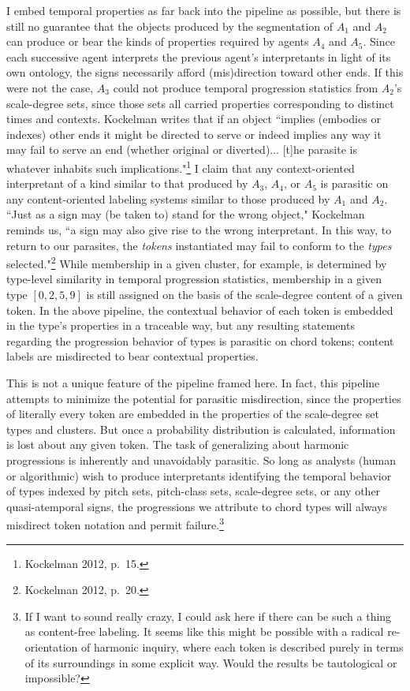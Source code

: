 I embed temporal properties as far back into the pipeline as possible, but there is still no guarantee that the objects produced by the segmentation of $A_1$ and $A_2$ can produce or bear the kinds of properties required by agents $A_4$ and $A_5$.  Since each successive agent interprets the previous agent's interpretants in light of its own ontology, the signs necessarily afford (mis)direction toward other ends.  If this were not the case, $A_3$ could not produce temporal progression statistics from $A_2$'s scale-degree sets, since those sets all carried properties corresponding to distinct times and contexts.  Kockelman writes that if an object ``implies (embodies or indexes) other ends it might be directed to serve or indeed implies any way it may fail to serve an end (whether original or diverted)... [t]he parasite is whatever inhabits such implications."\footnote{Kockelman 2012, p.\ 15.}  I claim that any context-oriented interpretant of a kind similar to that produced by $A_3$, $A_4$, or $A_5$ is parasitic on any content-oriented labeling systems similar to those produced by $A_1$ and $A_2$.  ``Just as a sign may (be taken to) stand for the wrong object," Kockelman reminds us, ``a  sign may also give rise to the wrong interpretant.  In this way, to return to our parasites, the \emph{tokens} instantiated may fail to conform to the \emph{types} selected."\footnote{Kockelman 2012, p.\ 20.}  While membership in a given cluster, for example, is determined by type-level similarity in temporal progression statistics, membership in a given type $[0,2,5,9]$ is still assigned on the basis of the scale-degree content of a given token.  In the above pipeline, the contextual behavior of each token is embedded in the type's properties in a traceable way, but any resulting statements regarding the progression behavior of types is parasitic on chord tokens; content labels are misdirected to bear contextual properties.

This is not a unique feature of the pipeline framed here.  In fact, this pipeline attempts to minimize the potential for parasitic misdirection, since the properties of literally every token are embedded in the properties of the scale-degree set types and clusters.  But once a probability distribution is calculated, information is lost about any given token.  The task of generalizing about harmonic progressions is inherently and unavoidably parasitic. So long as analysts (human or algorithmic) wish to produce interpretants identifying the temporal behavior of types indexed by pitch sets, pitch-class sets, scale-degree sets, or any other quasi-atemporal signs, the progressions we attribute to chord types will always misdirect token notation and permit failure.\footnote{If I want to sound really crazy, I could ask here if there can be such a thing as content-free labeling.  It seems like this might be possible with a radical re-orientation of harmonic inquiry, where each token is described purely in terms of its surroundings in some explicit way.  Would the results be tautological or impossible?}

